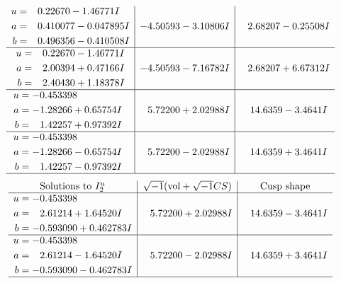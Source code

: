 \documentclass[1p]{elsarticle_modified}
\theoremstyle{definition}
\newcommand{\I}{\sqrt{-1}}
\begin{document}
$$\begin{array}{c|c|c}
\begin{aligned}
u &= \phantom{-}0.22670 - 1.46771 I \\
a &= \phantom{-}0.410077 - 0.047895 I \\
b &= \phantom{-}0.496356 - 0.410508 I\end{aligned}
 & -4.50593 - 3.10806 I & \phantom{-}2.68207 - 0.25508 I \\ \hline\begin{aligned}
u &= \phantom{-}0.22670 - 1.46771 I \\
a &= \phantom{-}2.00394 + 0.47166 I \\
b &= \phantom{-}2.40430 + 1.18378 I\end{aligned}
 & -4.50593 - 7.16782 I & \phantom{-}2.68207 + 6.67312 I \\ \hline\begin{aligned}
u &= -0.453398\phantom{ +0.000000I} \\
a &= -1.28266 + 0.65754 I \\
b &= \phantom{-}1.42257 + 0.97392 I\end{aligned}
 & \phantom{-}5.72200 + 2.02988 I & \phantom{-}14.6359 - 3.4641 I \\ \hline\begin{aligned}
u &= -0.453398\phantom{ +0.000000I} \\
a &= -1.28266 - 0.65754 I \\
b &= \phantom{-}1.42257 - 0.97392 I\end{aligned}
 & \phantom{-}5.72200 - 2.02988 I & \phantom{-}14.6359 + 3.4641 I\\
 \hline 
 \end{array}$$\newpage$$\begin{array}{c|c|c}  
\text{Solutions to }I^u_{2}& \I (\text{vol} + \sqrt{-1}CS) & \text{Cusp shape}\\
 \hline 
\begin{aligned}
u &= -0.453398\phantom{ +0.000000I} \\
a &= \phantom{-}2.61214 + 1.64520 I \\
b &= -0.593090 + 0.462783 I\end{aligned}
 & \phantom{-}5.72200 + 2.02988 I & \phantom{-}14.6359 - 3.4641 I \\ \hline\begin{aligned}
u &= -0.453398\phantom{ +0.000000I} \\
a &= \phantom{-}2.61214 - 1.64520 I \\
b &= -0.593090 - 0.462783 I\end{aligned}
 & \phantom{-}5.72200 - 2.02988 I & \phantom{-}14.6359 + 3.4641 I\\
 \hline 
 \end{array}$$\newpage\newpage\renewcommand{\arraystretch}{1}
\end{document}
